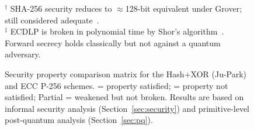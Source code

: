 \begin{figure}[!t]
{%
}
\vspace{4pt}

\begin{minipage}{\columnwidth}
\footnotesize
  $^\dagger$ SHA-256 security reduces to $\approx$128-bit equivalent under Grover;
  still considered adequate~\cite{NISTFIPS1804}.\\
  $^\ddagger$ ECDLP is broken in polynomial time by Shor's algorithm~\cite{Shor1997}.
  Forward secrecy holds classically but not against a quantum adversary.
\end{minipage}

\caption{Security property comparison matrix for the Hash+XOR (Ju-Park) and
ECC P-256 schemes. \checkmark = property satisfied; \texttimes = property not
satisfied; Partial = weakened but not broken. Results are based on informal
security analysis (Section~\ref{sec:security}) and primitive-level
post-quantum analysis (Section~\ref{sec:pq}).}
\label{fig:security_matrix}
\end{figure}
